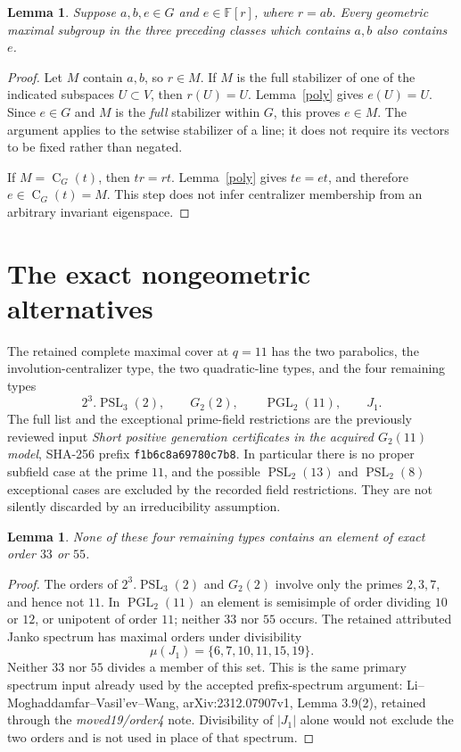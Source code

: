 \documentclass[11pt]{article}
\newtheorem{lemma}[theorem]{Lemma}
\newcommand{\F}{\mathbb F}
\newcommand{\CG}{\operatorname{C}}
\begin{document}
\begin{lemma}\label{containers}
Suppose $a,b,e\in G$ and $e\in\F[r]$, where $r=ab$. Every geometric
maximal subgroup in the three preceding classes which contains $a,b$
also contains $e$.
\end{lemma}
\begin{proof}
Let $M$ contain $a,b$, so $r\in M$. If $M$ is the full stabilizer of
one of the indicated subspaces $U\subset V$, then $r(U)=U$.
Lemma~\ref{poly} gives $e(U)=U$. Since $e\in G$ and $M$ is the
\emph{full} stabilizer within $G$, this proves $e\in M$. The argument
applies to the setwise stabilizer of a line; it does not require its
vectors to be fixed rather than negated.

If $M=\CG_G(t)$, then $tr=rt$. Lemma~\ref{poly} gives $te=et$, and
therefore $e\in\CG_G(t)=M$. This step does not infer centralizer
membership from an arbitrary invariant eigenspace.
\end{proof}

\section{The exact nongeometric alternatives}

The retained complete maximal cover at $q=11$ has the two parabolics,
the involution-centralizer type, the two quadratic-line types, and the
four remaining types
\[
 2^3.\operatorname{PSL}_3(2),\qquad
 G_2(2),\qquad \operatorname{PGL}_2(11),\qquad J_1.
\]
The full list and the exceptional prime-field restrictions are the
previously reviewed input \emph{Short positive generation certificates
in the acquired $G_2(11)$ model}, SHA-256 prefix
\texttt{f1b6c8a69780c7b8}. In particular there is no proper subfield
case at the prime $11$, and the possible $\operatorname{PSL}_2(13)$
and $\operatorname{PSL}_2(8)$ exceptional cases are excluded by the
recorded field restrictions. They are not silently discarded by an
irreducibility assumption.

\begin{lemma}\label{exceptional}
None of these four remaining types contains an element of exact order
$33$ or $55$.
\end{lemma}
\begin{proof}
The orders of $2^3.\operatorname{PSL}_3(2)$ and $G_2(2)$ involve only
the primes $2,3,7$, and hence not $11$. In $\operatorname{PGL}_2(11)$
an element is semisimple of order dividing $10$ or $12$, or unipotent
of order $11$; neither $33$ nor $55$ occurs. The retained attributed
Janko spectrum has maximal orders under divisibility
\[
 \mu(J_1)=\{6,7,10,11,15,19\}.
\]
Neither $33$ nor $55$ divides a member of this set. This is the same
primary spectrum input already used by the accepted prefix-spectrum
argument: Li--Moghaddamfar--Vasil'ev--Wang,
arXiv:2312.07907v1, Lemma 3.9(2), retained through the
\emph{moved19/order4} note. Divisibility of $|J_1|$ alone would not
exclude the two orders and is not used in place of that spectrum.
\end{proof}
\end{document}
